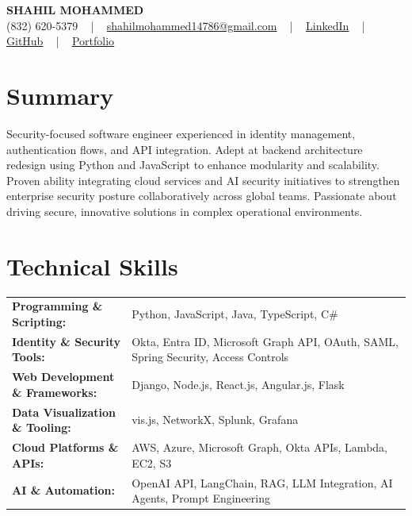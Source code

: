 \documentclass[letterpaper,11pt]{article}
\begin{document}
\begin{center}
    {\fontsize{14pt}{12pt}\selectfont \textbf{\MakeUppercase{Shahil Mohammed}}}\\ \vspace{2pt}
    \fontsize{10pt}{12pt}\selectfont (832) 620-5379 ~ | ~ \href{mailto:shahilmohammed14786@gmail.com}{shahilmohammed14786@gmail.com} ~ | ~  
    \href{https://www.linkedin.com/in/shahil-mohammed-9652931a1/}{\color{blue}\underline{LinkedIn}}  ~ | ~ 
    \href{https://github.com/freakbeast14}{\color{blue}\underline{GitHub}} ~ | ~ 
    \href{https://shahil-mohammed.netlify.app/}{\color{blue}\underline{Portfolio}}
    \vspace{-8pt}
\end{center}

\section{Summary}
\fontsize{9pt}{10pt}\selectfont
Security-focused software engineer experienced in identity management, authentication flows, and API integration. Adept at backend architecture redesign using Python and JavaScript to enhance modularity and scalability. Proven ability integrating cloud services and AI security initiatives to strengthen enterprise security posture collaboratively across global teams. Passionate about driving secure, innovative solutions in complex operational environments.
 \vspace{-5pt}
 
\section{Technical Skills}
        \vspace{-14pt}
        \begin{table}[h]
            \fontsize{9pt}{10pt}\selectfont
            \begin{tabular}{p{0.3\linewidth} p{0.7\linewidth}}
                \textbf{Programming \& Scripting:} & Python, JavaScript, Java, TypeScript, C\# \\
                \textbf{Identity \& Security Tools:} & Okta, Entra ID, Microsoft Graph API, OAuth, SAML, Spring Security, Access Controls \\
                \textbf{Web Development \& Frameworks:} & Django, Node.js, React.js, Angular.js, Flask \\
                \textbf{Data Visualization \& Tooling:} & vis.js, NetworkX, Splunk, Grafana \\
                \textbf{Cloud Platforms \& APIs:} & AWS, Azure, Microsoft Graph, Okta APIs, Lambda, EC2, S3 \\
                \textbf{AI \& Automation:} & OpenAI API, LangChain, RAG, LLM Integration, AI Agents, Prompt Engineering \\
            \end{tabular}
        \end{table}
 \vspace{-15pt}
 
\end{document}
